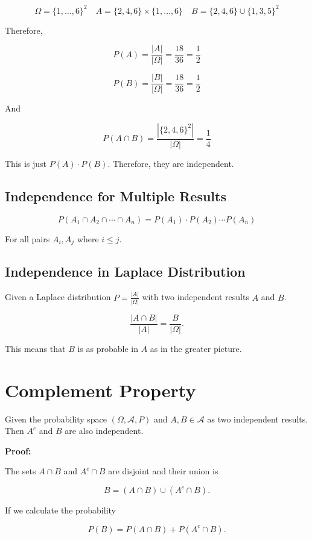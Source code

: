 \[
    \Omega = \{1, \dots, 6\}^2 \quad A = \{2,4,6\} \times \{1, \dots, 6\} \quad B = \{2,4,6\} \cup \{1,3,5\}^2
\]

Therefore, 

\[
    P(A) = \frac{|A|}{|\Omega|} = \frac{18}{36} = \frac{1}{2}
\]

\[
    P(B) = \frac{|B|}{|\Omega|} = \frac{18}{36} = \frac{1}{2}
\]

And  

\[
    P(A \cap B) = \frac{| \{2,4,6\}^2| }{|\Omega|} = \frac{1}{4}
\]

This is just \(P(A) \cdot P(B)\). Therefore, they are independent.

\QED 

\subsection{Independence for Multiple Results}

\[
    P(A_1 \cap A_2 \cap \cdots \cap A_n) = P(A_1) \cdot P(A_2) \cdots P(A_n) 
\]

For all pairs \(A_i, A_j\) where \(i \le j\). 

\subsection{Independence in Laplace Distribution}

Given a Laplace distribution \(P = \frac{|A|}{|\Omega|}\) with two independent results 
\(A\) and \(B\). 

\[
    \frac{|A \cap B|}{|A|} = \frac{B}{|\Omega|}.
\]

This means that \(B\) is as probable in \(A\) as in the greater picture.

\section{Complement Property}

Given the probability space \((\Omega, \mathcal{A}, P)\) and \(A, B \in \mathcal{A}\) as two 
independent results. Then \(A^c\) and \(B\) are also independent.

\textbf{Proof:}

The sets \(A \cap B\) and \(A^c \cap B\) are disjoint and their union is 

\[
    B = (A \cap B) \cup  (A^c \cap B).
\]

If we calculate the probability 

\[
    P(B) = P(A \cap B) +  P(A^c \cap B).
\]

